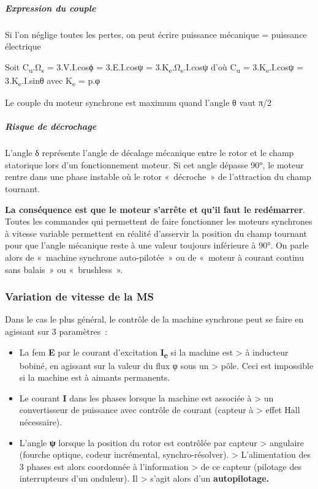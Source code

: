 \hypertarget{expression-du-couple}{%
\subparagraph*{Expression du couple}\label{expression-du-couple}}

Si l'on néglige toutes les pertes, on peut écrire puissance mécanique = puissance électrique

Soit C\textsubscript{u}.Ω\textsubscript{s} = 3.V.I.cosϕ = 3.E.I.cosψ = 3.K\textsubscript{e}.Ω\textsubscript{s}.I.cosψ d'où C\textsubscript{u} = 3.K\textsubscript{e}.I.cosψ = 3.K\textsubscript{e}.I.sinθ avec K\textsubscript{e} = p.φ

Le couple du moteur synchrone est maximum quand l'angle θ vaut π/2

\hypertarget{risque-de-duxe9crochage}{%
\subparagraph*{Risque de décrochage}\label{risque-de-duxe9crochage}}

L'angle δ représente l'angle de décalage mécanique entre le rotor et le champ statorique lors d'un fonctionnement moteur. Si cet angle dépasse 90°, le moteur rentre dans une phase instable où le rotor «~décroche~» de l'attraction du champ tournant.

\textbf{La conséquence est que le moteur s'arrête et qu'il faut le redémarrer}. Toutes les commandes qui permettent de faire fonctionner les moteurs synchrones à vitesse variable permettent en réalité d'asservir la position du champ tournant pour que l'angle mécanique reste à une valeur toujours inférieure à 90°. On parle alors de «~machine synchrone auto-pilotée~» ou de «~moteur à courant continu sans balais~» ou «~brushless~».

\hypertarget{variation-de-vitesse-de-la-ms}{%
\subsubsection{Variation de vitesse de la MS}\label{variation-de-vitesse-de-la-ms}}

Dans le cas le plus général, le contrôle de la machine synchrone peut se faire en agissant sur 3 paramètres~:

\begin{itemize}
\item
  La fem \textbf{E} par le courant d'excitation \textbf{I\textsubscript{e}} si la machine est \textgreater{} à inducteur bobiné, en agissant sur la valeur du flux φ sous un \textgreater{} pôle. Ceci est impossible si la machine est à aimants permanents.
\item
  Le courant \textbf{I} dans les phases lorsque la machine est associée à \textgreater{} un convertisseur de puissance avec contrôle de courant (capteur à \textgreater{} effet Hall nécessaire).
\item
  L'angle \textbf{ψ} lorsque la position du rotor est contrôlée par capteur \textgreater{} angulaire (fourche optique, codeur incrémental, synchro-résolver). \textgreater{} L'alimentation des 3 phases est alors coordonnée à l'information \textgreater{} de ce capteur (pilotage des interrupteurs d'un onduleur). Il \textgreater{} s'agit alors d'un \textbf{autopilotage.}
\end{itemize}

